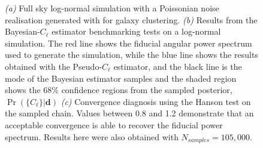 \begin{figure}
\begin{subfigure}{.5\textwidth}
  \caption{}
\end{subfigure}
\caption[Bayesian-$C_{\ell}$ estimator tested on a full sky \flask log-normal simulation.]{\textit{(a)} Full sky log-normal simulation with a Poissonian noise realisation generated with \flask for galaxy clustering.  \textit{(b)} Results from the Bayesian-$C_{\ell}$ estimator benchmarking tests on a log-normal simulation. The red line shows the fiducial angular power spectrum used to generate the simulation, while the blue line shows the results obtained with the Pseudo-$C_{\ell}$ estimator, and the black line is the mode of the Bayesian estimator samples and the shaded region shows the 68\% confidence regions from the sampled posterior, $\Pr (\{C_{\ell}\}|\mathbf{d})$ \textit{(c)} Convergence diagnosis using the Hanson test on the sampled chain. Values between 0.8 and 1.2 demonstrate that an acceptable convergence is able to recover the fiducial power spectrum. Results here were also obtained with $N_{samples} = 105,000$.}
\label{fig:BPL:LogNormalFSAnalysis}
\end{figure}


